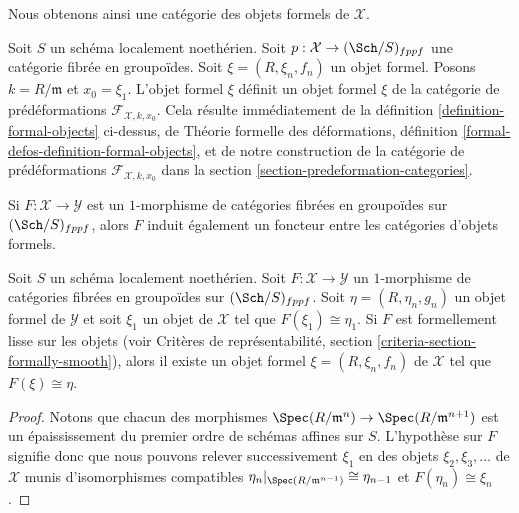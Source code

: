 \noindent
Nous obtenons ainsi une catégorie des objets formels de $\mathcal{X}$.

\begin{remark}
\label{remark-formal-objects-match}
Soit $S$ un schéma localement noethérien. Soit
$p : \mathcal{X} \to (\Sch/S)_{fppf}$ une catégorie fibrée en groupoïdes.
Soit $\xi = (R, \xi_n, f_n)$ un objet formel. Posons
$k = R/\mathfrak m$ et $x_0 = \xi_1$. L'objet formel $\xi$ définit un objet
formel $\xi$ de la catégorie de prédéformations
$\mathcal{F}_{\mathcal{X}, k, x_0}$. Cela résulte immédiatement de la
définition \ref{definition-formal-objects} ci-dessus, de Théorie formelle des
déformations, définition \ref{formal-defos-definition-formal-objects}, et de
notre construction de la catégorie de prédéformations
$\mathcal{F}_{\mathcal{X}, k, x_0}$ dans la section
\ref{section-predeformation-categories}.
\end{remark}

\noindent
Si $F : \mathcal{X} \to \mathcal{Y}$ est un $1$-morphisme de catégories
fibrées en groupoïdes sur $(\Sch/S)_{fppf}$, alors $F$ induit également un
foncteur entre les catégories d'objets formels.

\begin{lemma}
\label{lemma-smooth-lift-formal}
Soit $S$ un schéma localement noethérien. Soit
$F : \mathcal{X} \to \mathcal{Y}$ un $1$-morphisme de catégories fibrées en
groupoïdes sur $(\Sch/S)_{fppf}$. Soit $\eta = (R, \eta_n, g_n)$ un objet
formel de $\mathcal{Y}$ et soit $\xi_1$ un objet de $\mathcal{X}$ tel que
$F(\xi_1) \cong \eta_1$. Si $F$ est formellement lisse sur les objets (voir
Critères de représentabilité, section
\ref{criteria-section-formally-smooth}), alors il existe un objet formel
$\xi = (R, \xi_n, f_n)$ de $\mathcal{X}$ tel que $F(\xi) \cong \eta$.
\end{lemma}

\begin{proof}
Notons que chacun des morphismes
$\Spec(R/\mathfrak m^n) \to \Spec(R/\mathfrak m^{n + 1})$ est un
épaississement du premier ordre de schémas affines sur $S$. L'hypothèse sur
$F$ signifie donc que nous pouvons relever successivement $\xi_1$ en des
objets $\xi_2, \xi_3, \ldots$ de $\mathcal{X}$ munis d'isomorphismes
compatibles
$\eta_n|_{\Spec(R/\mathfrak m^{n - 1})} \cong \eta_{n - 1}$
et $F(\eta_n) \cong \xi_n$.
\end{proof}

